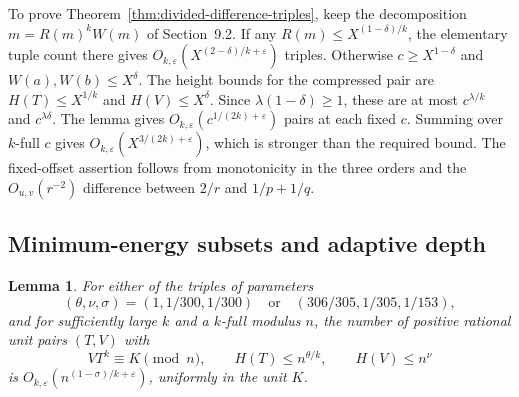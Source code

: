 \documentclass[11pt,reqno]{amsart}
\newtheorem{lemma}[theorem]{Lemma}
\newcommand{\eps}{\varepsilon}
\begin{document}
To prove Theorem~\ref{thm:divided-difference-triples}, keep the
decomposition \(m=R(m)^kW(m)\) of Section~9.2.
If any \(R(m)\le X^{(1-\delta)/k}\), the elementary
tuple count there gives \(O_{k,\eps}(X^{(2-\delta)/k+\eps})\)
triples. Otherwise \(c\ge X^{1-\delta}\) and
\(W(a),W(b)\le X^\delta\). The height bounds for the compressed
pair are \(H(T)\le X^{1/k}\) and \(H(V)\le X^\delta\).
Since \(\lambda(1-\delta)\ge1\), these are at most
\(c^{\lambda/k}\) and \(c^{\lambda\delta}\).
The lemma gives \(O_{k,\eps}(c^{1/(2k)+\eps})\)
pairs at each fixed \(c\). Summing over \(k\)-full \(c\)
gives \(O_{k,\eps}(X^{3/(2k)+\eps})\), which is stronger
than the required bound. The fixed-offset assertion
follows from monotonicity in the three orders and the
\(O_{u,v}(r^{-2})\) difference between \(2/r\) and \(1/p+1/q\).

\subsection{Minimum-energy subsets and adaptive depth}
\label{sec:adaptive-triples}

\begin{lemma}\label{lem:adaptive-rational}
For either of the triples of parameters
\[
 (\theta,\nu,\sigma)=(1,1/300,1/300)
             \quad\text{or}\quad (306/305,1/305,1/153),
\]
and for sufficiently large \(k\) and a \(k\)-full modulus \(n\),
the number of positive rational unit pairs \((T,V)\) with
\[
 VT^k\equiv K\pmod n,\qquad
 H(T)\le n^{\theta/k},\qquad H(V)\le n^\nu
\]
is \(O_{k,\eps}(n^{(1-\sigma)/k+\eps})\), uniformly in the unit \(K\).
\end{lemma}
\end{document}
